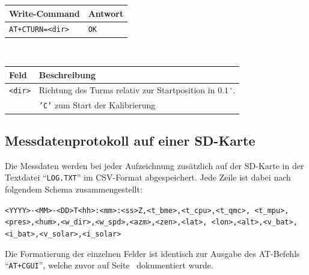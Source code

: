         \begin{table}[H]
            \centering
            \begin{tabular}{|p{}|p{}|}
                \hline
                \textbf{Write-Command} &\textbf{Antwort} \\
                \hline
                \texttt{AT+CTURN=<dir>} & \texttt{OK}\\
                \hline
            \end{tabular}\\[3mm]
            \begin{tabular}{|p{}|p{}|}
                \hline
                \textbf{Feld}       & \textbf{Beschreibung}\\
                \hline
                \texttt{<dir>}      & Richtung des Turms relativ zur Startposition in $0.1\,^\circ$.\\
                                    & \texttt{'C'} zum Start der Kalibrierung\\
                \hline
            \end{tabular}
        \end{table}
    
    \subsection{Messdatenprotokoll auf einer SD-Karte}\label{ssec:SD_Card}
        Die Messdaten werden bei jeder Aufzeichnung zusätzlich auf der SD-Karte in der Textdatei ``\texttt{LOG.TXT}'' im CSV-Format abgespeichert. Jede Zeile ist dabei nach folgendem Schema zusammengestellt:
        \begin{center}
            \texttt{<YYYY>-<MM>-<DD>T<hh>:<mm>:<ss>Z,<t\_bme>,<t\_cpu>,<t\_qmc>, <t\_mpu>,<pres>,<hum>,<w\_dir>,<w\_spd>,<azm>,<zen>,<lat>, <lon>,<alt>,<v\_bat>,<i\_bat>,<v\_solar>,<i\_solar>}
        \end{center}
    
        Die Formatierung der einzelnen Felder ist identisch zur Ausgabe des AT-Befehls ``\texttt{AT+CGUI}'', welche zuvor auf Seite~\pageref{tab:at_cgui} dokumentiert wurde.